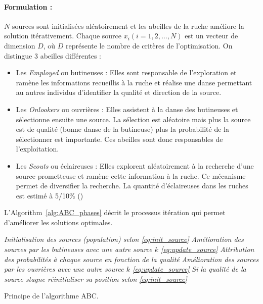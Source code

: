 \paragraph{Formulation :} %
\label{par:formulation}
$N$ sources sont initialisées aléatoirement et les abeilles de la
ruche améliore la solution itérativement. Chaque source $x_{i}(i = 1, 2, \dotsc, N)$ est un vecteur
de dimension $D$, où $D$ représente le nombre de critères de l’optimisation.
On distingue 3 abeilles différentes :
\begin{itemize}
  \item Les \emph{Employed} ou butineuses : Elles sont responsable de l’exploration
        et ramène les informations recueillis à la ruche et réalise une danse
        permettant au autres individus d’identifier la qualité et direction de la
        source.
  \item Les \emph{Onlookers} ou ouvrières : Elles assistent à la danse des butineuses
        et sélectionne ensuite une source. La sélection est aléatoire mais plus
        la source est de qualité (bonne danse de la butineuse) plus la probabilité
        de la sélectionner est importante. Ces abeilles sont donc responsables
        de l’exploitation.
  \item Les \emph{Scouts} ou éclaireuses : Elles explorent aléatoirement à la recherche
        d’une source prometteuse et ramène cette information à la ruche. Ce mécanisme
        permet de diversifier la recherche. La quantité d’éclaireuses dans les ruches
        est estimé à 5/10\si{\percent} (\cite{Seeley1996})
\end{itemize}

L’Algorithm~\ref{alg:ABC_phases} décrit le processus itération qui permet d’améliorer
les solutions optimales.
\begin{algorithm}\label{alg:ABC_phases}
  \SetAlgoVlined
  \emph{Initialisation des sources (population) selon \eqref{eq:init_source}}\;
  {
  {
    {
    \emph{Amélioration des sources par les butineuses avec une autre source $k$ \eqref{eq:update_source}}\;
    \emph{Attribution des probabilités à chaque source en fonction de la qualité}\;
    \emph{Amélioration des sources par les ouvrières avec une autre source $k$ \eqref{eq:update_source}}\;
    \emph{Si la qualité de la source stagne réinitialiser sa position selon \eqref{eq:init_source}}\;
    }
  }
  }
  \caption{Principe de l’algorithme ABC.}
\end{algorithm}

